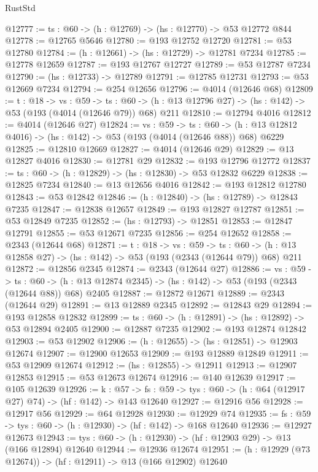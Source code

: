\begin{lexlean}{RustStd}
\begin{coremodule}
@12777 := {ts : @60} -> (h : @12769) -> (hs : @12770) -> @53 @12772 @844
@12778 := @12765 @5646
@12780 := @193 @12752 @12720
@12781 := @53 @12780
@12784 := (h : @12661) -> (hs : @12729) -> @12781 @7234
@12785 := @12778 @12659
@12787 := @193 @12767 @12727
@12789 := @53 @12787 @7234
@12790 := (hs : @12733) -> @12789
@12791 := @12785 @12731
@12793 := @53 @12669 @7234
@12794 := @254 @12656
@12796 := @4014 (@12646 @68)
@12809 := {t : @18} ->
  {vs : @59} ->
  {ts : @60} -> (h : @13 @12796 @27) -> (hs : @142) -> @53 (@193 (@4014 (@12646 @79)) @68) @211
@12810 := @12794 @4016
@12812 := @4014 (@12646 @27)
@12824 := {vs : @59} ->
  {ts : @60} -> (h : @13 @12812 @4016) -> (hs : @142) -> @53 (@193 (@4014 (@12646 @88)) @68) @6229
@12825 := @12810 @12669
@12827 := @4014 (@12646 @29)
@12829 := @13 @12827 @4016
@12830 := @12781 @29
@12832 := @193 @12796 @12772
@12837 := {ts : @60} -> (h : @12829) -> (hs : @12830) -> @53 @12832 @6229
@12838 := @12825 @7234
@12840 := @13 @12656 @4016
@12842 := @193 @12812 @12780
@12843 := @53 @12842
@12846 := (h : @12840) -> (hs : @12789) -> @12843 @7235
@12847 := @12838 @12657
@12849 := @193 @12827 @12787
@12851 := @53 @12849 @7235
@12852 := (hs : @12793) -> @12851
@12853 := @12847 @12791
@12855 := @53 @12671 @7235
@12856 := @254 @12652
@12858 := @2343 (@12644 @68)
@12871 := {t : @18} ->
  {vs : @59} ->
  {ts : @60} -> (h : @13 @12858 @27) -> (hs : @142) -> @53 (@193 (@2343 (@12644 @79)) @68) @211
@12872 := @12856 @2345
@12874 := @2343 (@12644 @27)
@12886 := {vs : @59} ->
  {ts : @60} -> (h : @13 @12874 @2345) -> (hs : @142) -> @53 (@193 (@2343 (@12644 @88)) @68) @2405
@12887 := @12872 @12671
@12889 := @2343 (@12644 @29)
@12891 := @13 @12889 @2345
@12892 := @12843 @29
@12894 := @193 @12858 @12832
@12899 := {ts : @60} -> (h : @12891) -> (hs : @12892) -> @53 @12894 @2405
@12900 := @12887 @7235
@12902 := @193 @12874 @12842
@12903 := @53 @12902
@12906 := (h : @12655) -> (hs : @12851) -> @12903 @12674
@12907 := @12900 @12653
@12909 := @193 @12889 @12849
@12911 := @53 @12909 @12674
@12912 := (hs : @12855) -> @12911
@12913 := @12907 @12853
@12915 := @53 @12673 @12674
@12916 := @140 @12639
@12917 := @105 @12639
@12926 := {k : @57} ->
  {fs : @59} -> {tys : @60} -> (h : @64 (@12917 @27) @74) -> (hf : @142) -> @143 @12640
@12927 := @12916 @56
@12928 := @12917 @56
@12929 := @64 @12928
@12930 := @12929 @74
@12935 := {fs : @59} -> {tys : @60} -> (h : @12930) -> (hf : @142) -> @168 @12640
@12936 := @12927 @12673
@12943 := {tys : @60} -> (h : @12930) -> (hf : @12903 @29) -> @13 (@166 @12894) @12640
@12944 := @12936 @12674
@12951 := (h : @12929 (@73 @12674)) -> (hf : @12911) -> @13 (@166 @12902) @12640

\end{coremodule}
\end{lexlean}
